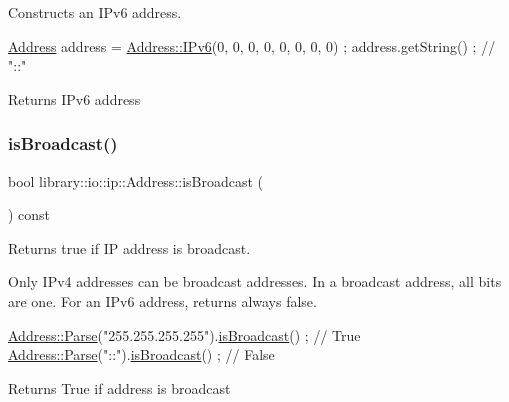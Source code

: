 Constructs an I\+Pv6 address. 


\begin{DoxyCode}
\hyperlink{classlibrary_1_1io_1_1ip_1_1_address_ab968d468b8bc2ba8f48fd2b6784832fe}{Address} address = \hyperlink{classlibrary_1_1io_1_1ip_1_1_address_aa89db4931003a16ebfaea376308164ab}{Address::IPv6}(0, 0, 0, 0, 0, 0, 0, 0) ;
address.getString() ; \textcolor{comment}{// "::"}
\end{DoxyCode}


\begin{DoxyReturn}{Returns}
I\+Pv6 address 
\end{DoxyReturn}
\mbox{\label{classlibrary_1_1io_1_1ip_1_1_address_ac82a4af0af42e2ddc02fe2fc7c9593e5}} 
\subsubsection{\texorpdfstring{is\+Broadcast()}{isBroadcast()}}
{\footnotesize\ttfamily bool library\+::io\+::ip\+::\+Address\+::is\+Broadcast (\begin{DoxyParamCaption}{ }\end{DoxyParamCaption}) const}



Returns true if IP address is broadcast. 

Only I\+Pv4 addresses can be broadcast addresses. In a broadcast address, all bits are one. For an I\+Pv6 address, returns always false.


\begin{DoxyCode}
\hyperlink{classlibrary_1_1io_1_1ip_1_1_address_af8ab0e365de3c00109b456ee94e2590b}{Address::Parse}(\textcolor{stringliteral}{"255.255.255.255"}).\hyperlink{classlibrary_1_1io_1_1ip_1_1_address_ac82a4af0af42e2ddc02fe2fc7c9593e5}{isBroadcast}() ; \textcolor{comment}{// True}
\hyperlink{classlibrary_1_1io_1_1ip_1_1_address_af8ab0e365de3c00109b456ee94e2590b}{Address::Parse}(\textcolor{stringliteral}{"::"}).\hyperlink{classlibrary_1_1io_1_1ip_1_1_address_ac82a4af0af42e2ddc02fe2fc7c9593e5}{isBroadcast}() ; \textcolor{comment}{// False}
\end{DoxyCode}


\begin{DoxyReturn}{Returns}
True if address is broadcast 
\end{DoxyReturn}
\mbox{\label{classlibrary_1_1io_1_1ip_1_1_address_adb0cb92c138c3aa983ce007318cca1a8}} 
